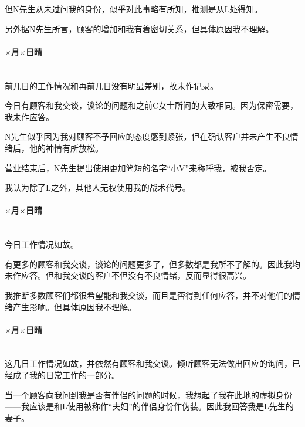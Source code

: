 但N先生从未过问我的身份，似乎对此事略有所知，推测是从L处得知。

另外据N先生所言，顾客的增加和我有着密切关系，但具体原因我不理解。

\par

\paragraph*{$\times$月$\times$日\quad 晴}\mbox{}\\

前几日的工作情况和再前几日没有明显差别，故未作记录。

今日有顾客和我交谈，谈论的问题和之前C女士所问的大致相同。因为保密需要，我未作应答。

N先生似乎因为我对顾客不予回应的态度感到紧张，但在确认客户并未产生不良情绪后，他的神情有所放松。

营业结束后，N先生提出使用更加简短的名字“小V”来称呼我，被我否定。

我认为除了L之外，其他人无权使用我的战术代号。

\par

\paragraph*{$\times$月$\times$日\quad 晴}\mbox{}\\

今日工作情况如故。

有更多的顾客和我交谈，谈论的问题更多了，但多数都是我所不了解的。因此我均未作应答。但和我交谈的客户不但没有不良情绪，反而显得很高兴。

我推断多数顾客们都很希望能和我交谈，而且是否得到任何应答，并不对他们的情绪产生影响。但具体原因我不理解。

\par

\paragraph*{$\times$月$\times$日\quad 晴}\mbox{}\\

这几日工作情况如故，并依然有顾客和我交谈。倾听顾客无法做出回应的询问，已经成了我的日常工作的一部分。

当一个顾客向我问到我是否有伴侣的问题的时候，我想起了我在此地的虚拟身份——我应该是和L使用被称作“夫妇”的伴侣身份作伪装。因此我回答我是L先生的妻子。

